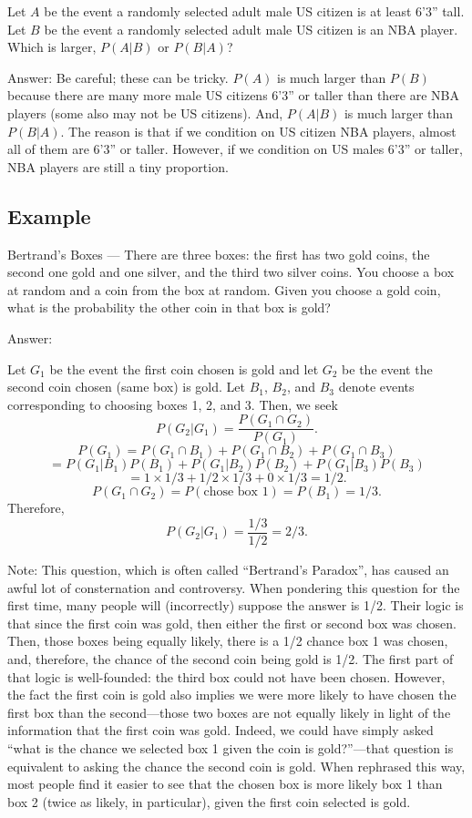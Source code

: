 \documentclass[
]{book}
\begin{document}
Let \(A\) be the event a randomly selected adult male US citizen is at least 6'3'' tall. Let \(B\) be the event a randomly selected adult male US citizen is an NBA player. Which is larger, \(P(A|B)\) or \(P(B|A)\)?

Answer:
Be careful; these can be tricky. \(P(A)\) is much larger than \(P(B)\) because there are many more male US citizens 6'3'' or taller than there are NBA players (some also may not be US citizens). And, \(P(A|B)\) is much larger than \(P(B|A)\). The reason is that if we condition on US citizen NBA players, almost all of them are 6'3'' or taller. However, if we condition on US males 6'3'' or taller, NBA players are still a tiny proportion.

\hypertarget{example-2}{%
\subsection{Example}\label{example-2}}

Bertrand's Boxes --- There are three boxes: the first has two gold coins, the second one gold and one silver, and the third two silver coins. You choose a box at random and a coin from the box at random. Given you choose a gold coin, what is the probability the other coin in that box is gold?

Answer:

Let \(G_1\) be the event the first coin chosen is gold and let \(G_2\) be the event the second coin chosen (same box) is gold. Let \(B_1\), \(B_2\), and \(B_3\) denote events corresponding to choosing boxes 1, 2, and 3. Then, we seek
\[P(G_2|G_1) = \frac{P(G_1\cap G_2)}{P(G_1)}.\]
\[P(G_1) = P(G_1 \cap B_1) + P(G_1 \cap B_2) + P(G_1 \cap B_3)\]
\[ = P(G_1 | B_1)P(B_1) + P(G_1 | B_2)P(B_2)+ P(G_1 | B_3)P(B_3)\]
\[ = 1 \times 1/3 + 1/2 \times 1/3 + 0 \times 1 /3 = 1/2.\]
\[P(G_1\cap G_2) = P(\text{chose box 1}) = P(B_1) = 1/3.\]
Therefore,
\[P(G_2|G_1) = \frac{1/3}{1/2} = 2/3.\]

Note: This question, which is often called ``Bertrand's Paradox'', has caused an awful lot of consternation and controversy. When pondering this question for the first time, many people will (incorrectly) suppose the answer is 1/2. Their logic is that since the first coin was gold, then either the first or second box was chosen. Then, those boxes being equally likely, there is a 1/2 chance box 1 was chosen, and, therefore, the chance of the second coin being gold is 1/2. The first part of that logic is well-founded: the third box could not have been chosen. However, the fact the first coin is gold also implies we were more likely to have chosen the first box than the second---those two boxes are not equally likely in light of the information that the first coin was gold. Indeed, we could have simply asked ``what is the chance we selected box 1 given the coin is gold?''---that question is equivalent to asking the chance the second coin is gold. When rephrased this way, most people find it easier to see that the chosen box is more likely box 1 than box 2 (twice as likely, in particular), given the first coin selected is gold.
\end{document}
